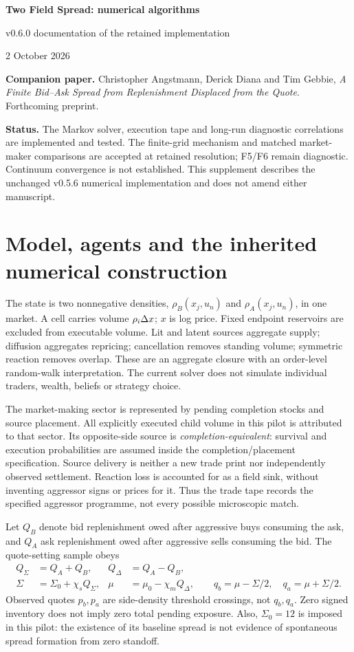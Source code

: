 \documentclass[11pt,a4paper]{article}
\begin{document}
\begin{center}
{\Large\bfseries Two Field Spread: numerical algorithms}\par
{\large v0.6.0 documentation of the retained implementation}\par
2 October 2026
\end{center}
{\small \textbf{Companion paper.} Christopher Angstmann, Derick Diana and Tim Gebbie, \emph{A Finite Bid--Ask Spread from Replenishment Displaced from the Quote}. Forthcoming preprint.}\par

\textbf{Status.} The Markov solver, execution tape and long-run diagnostic correlations are
implemented and tested. The finite-grid mechanism and matched market-maker
comparisons are accepted at retained resolution; F5/F6 remain diagnostic.
Continuum convergence is not established. This supplement describes the
unchanged v0.5.6 numerical implementation and does not amend either manuscript.

\section{Model, agents and the inherited numerical construction}
The state is two nonnegative densities, $\rho_B(x_j,u_n)$ and
$\rho_A(x_j,u_n)$, in one market. A cell carries volume $\rho_i\Delta x$;
$x$ is log price. Fixed endpoint reservoirs are excluded from executable
volume. Lit and latent sources aggregate supply; diffusion aggregates
repricing; cancellation removes standing volume; symmetric reaction removes
overlap. These are an aggregate closure with an order-level random-walk
interpretation. The current solver does not simulate individual traders,
wealth, beliefs or strategy choice.

The market-making sector is represented by pending completion stocks and
source placement. All explicitly executed child volume in this pilot is
attributed to that sector. Its opposite-side source is
\emph{completion-equivalent}: survival and execution probabilities are
assumed inside the completion/placement specification. Source delivery is
neither a new trade print nor independently observed settlement. Reaction
loss is accounted for as a field sink, without inventing aggressor signs or
prices for it. Thus the trade tape records the specified aggressor programme,
not every possible microscopic match.

Let $Q_B$ denote bid replenishment owed after aggressive buys consuming the ask,
and $Q_A$ ask replenishment owed after aggressive sells consuming the bid. The quote-setting sample obeys
\begin{align}
 Q_\Sigma&=Q_A+Q_B,& Q_\Delta&=Q_A-Q_B,\\
 \Sigma&=\Sigma_0+\chi_s Q_\Sigma,&
 \mu&=\mu_0-\chi_m Q_\Delta,\qquad
 q_b=\mu-\Sigma/2,\quad q_a=\mu+\Sigma/2.
\end{align}
Observed quotes $p_b,p_a$ are side-density threshold crossings, not $q_b,q_a$.
Zero signed inventory does not imply zero total pending exposure. Also,
$\Sigma_0=12$ is imposed in this pilot: the existence of its baseline spread
is not evidence of spontaneous spread formation from zero standoff.
\end{document}
